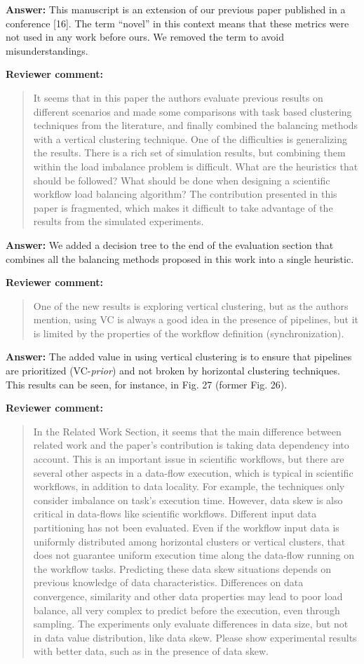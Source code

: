\documentclass{letter}
\newenvironment{review}%
{\textbf{Reviewer comment:}\begin{quote}}%
{\end{quote}}%
\newcommand{\answer}[1]{%
      \textbf{Answer:} #1}
\begin{document}
\begin{letter}{}
\answer{This manuscript is an extension of our previous paper published in a conference [16]. The term ``novel'' in this context means that these metrics were not used in any work before ours. We removed the term to avoid misunderstandings.}


\begin{review}
It seems that in this paper the authors evaluate previous results on different scenarios and made some comparisons with task based clustering techniques from the literature, and finally combined the balancing methods with a vertical clustering technique. One of the difficulties is generalizing the results. There is a rich set of simulation results, but combining them within the load imbalance problem is difficult. What are the heuristics that should be followed? What should be done when designing a scientific workflow load balancing algorithm? The contribution presented in this paper is fragmented, which makes it difficult to take advantage of the results from the simulated experiments. 
\end{review}

\answer{We added a decision tree to the end of the evaluation section that combines all the balancing methods proposed in this work into a single heuristic.}


\begin{review}
One of the new results is exploring vertical clustering, but as the authors mention, using VC is always a good idea in the presence of pipelines, but it is limited by the properties of the workflow definition (synchronization). 
\end{review}

\answer{The added value in using vertical clustering is to ensure that pipelines are prioritized (VC-\emph{prior}) and not broken by horizontal clustering techniques. This results can be seen, for instance, in Fig. 27 (former Fig. 26).}


\begin{review}
In the Related Work Section, it seems that the main difference between related work and the paper's contribution is taking data dependency into account. This is an important issue in scientific workflows, but there are several other aspects in a data-flow execution, which is typical in scientific workflows, in addition to data locality. For example, the techniques only consider imbalance on task's execution time. However, data skew is also critical in data-flows like scientific workflows. Different input data partitioning has not been evaluated. Even if the workflow input data is uniformly distributed among horizontal clusters or vertical clusters, that does not guarantee uniform execution time along the data-flow running on the workflow tasks. Predicting these data skew situations depends on previous knowledge of data characteristics. Differences on data convergence, similarity and other data properties may lead to poor load balance, all very complex to predict before the execution, even through sampling. The experiments only evaluate differences in data size, but not in data value distribution, like data skew. Please show experimental results with better data, such as in the presence of data skew.
\end{review}


\end{letter}
\end{document}
